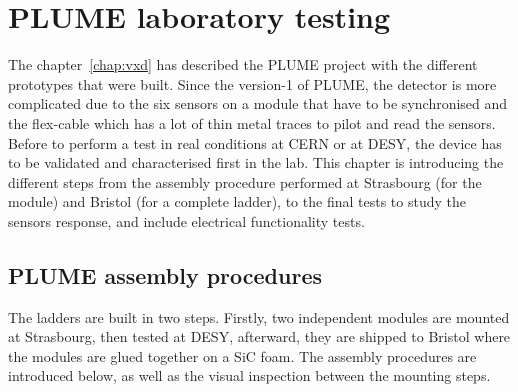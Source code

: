 \chapter{PLUME laboratory testing}
\label{chap:labTests}

  The chapter~\ref{chap:vxd} has described the \gls{PLUME} project with the different prototypes that were built. 
  Since the version-1 of \gls{PLUME}, the detector is more complicated due to the six sensors on a module that have to be synchronised and the flex-cable which has a lot of thin metal traces to pilot and read the sensors.
  Before to perform a test in real conditions at CERN or at DESY, the device has to be validated and characterised first in the lab.
  This chapter is introducing the different steps from the assembly procedure performed at Strasbourg (for the module) and Bristol (for a complete ladder), to the final tests to study the sensors response, and include electrical functionality tests.

 
 \minitoc
  

\section{PLUME assembly procedures}

  The ladders are built in two steps. 
  Firstly, two independent modules are mounted at Strasbourg, then tested at DESY, afterward, they are shipped to Bristol where the modules are glued together on a \gls{SiC} foam.
  The assembly procedures are introduced below, as well as the visual inspection between the mounting steps.

